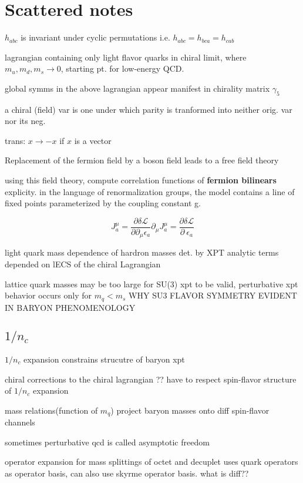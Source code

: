 \documentclass[12pt,tightenlines, raggedbottom, prd, notitlepage]{revtex4-1}
\begin{document}
\section*{Scattered notes}


$h_{abc}$ is invariant under cyclic permutations i.e. $h_{abc} = h_{bca} = h_{cab}$



lagrangian containing only light flavor quarks in chiral limit, where $m_u, m_d, m_s \rightarrow 0$, starting pt. for low-energy QCD. 

global symms in the above lagrangian appear manifest in chirality matrix $\gamma_5$

a chiral (field) var is one under which parity is tranformed into neither orig. var nor its neg. 

trans: $x \rightarrow -x$ if $x$ is a vector


Replacement of the fermion field by a boson field leads to a free field theory 

using this field theory, compute correlation functions of \textbf{fermion bilinears} explicity.
in the language of renormalization groups, the model contains a line of fixed points parameterized by 
the coupling constant g. 

$$
  J^\mu_a = \frac{\partial \delta \mathcal{L}}{\partial \partial_\mu \epsilon_a}
  \partial_{\mu} J^{\mu}_a = \frac{\partial \delta \mathcal{L}}{\partial\ \epsilon_a}
$$

light quark mass dependence of hardron masses det. by XPT 
analytic terms depended on lECS of the chiral Lagrangian

lattice quark masses may be too large for SU(3) xpt to be valid, 
perturbative xpt behavior occurs only for $m_q < m_s$
WHY SU3 FLAVOR SYMMETRY EVIDENT IN BARYON PHENOMENOLOGY

\subsection*{\texorpdfstring{$1/n_c$}{expansion}}
$1/n_c$ expansion constrains strucutre of baryon xpt 

chiral corrections to the chiral lagrangian ?? have to respect spin-flavor structure of $1/n_c$ expansion 

mass relations(function of $m_q$)  project baryon masses onto diff spin-flavor channels 

sometimes perturbative qcd is called asymptotic freedom 

operator expansion for mass splittings of octet and decuplet uses quark operators as operator basis, 
can also use skyrme operator basis. what is diff??
\end{document}
